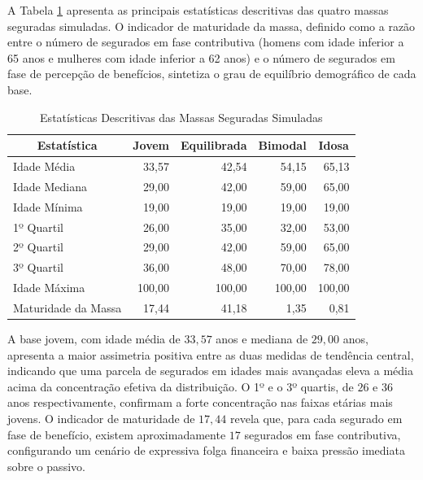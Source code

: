 A Tabela \ref{tab:estatisticas_descritivas} apresenta as principais estatísticas  descritivas das quatro massas seguradas simuladas. O indicador de maturidade da  massa, definido como a razão entre o número de segurados em fase contributiva  (homens com idade inferior a 65 anos e mulheres com idade inferior a 62 anos) e  o número de segurados em fase de percepção de benefícios, sintetiza o grau de  equilíbrio demográfico de cada base.

\vspace{0.25cm}
\begin{table}[htbp]
    \centering
    \caption{Estatísticas Descritivas das Massas Seguradas Simuladas}
    \renewcommand{\arraystretch}{1.2}
    \begin{tabular}{lrrrr}
    \toprule
    \multicolumn{1}{c}{\textbf{Estatística}} & \multicolumn{1}{c}{\textbf{Jovem}} & \multicolumn{1}{c}{\textbf{Equilibrada}} & \multicolumn{1}{c}{\textbf{Bimodal}} & \multicolumn{1}{c}{\textbf{Idosa}} \\
    \midrule
    Idade Média              & 33,57  & 42,54  & 54,15  & 65,13  \\
    Idade Mediana            & 29,00  & 42,00  & 59,00  & 65,00  \\
    Idade Mínima             & 19,00  & 19,00  & 19,00  & 19,00  \\
    1º Quartil               & 26,00  & 35,00  & 32,00  & 53,00  \\
    2º Quartil               & 29,00  & 42,00  & 59,00  & 65,00  \\
    3º Quartil               & 36,00  & 48,00  & 70,00  & 78,00  \\
    Idade Máxima             & 100,00 & 100,00 & 100,00 & 100,00 \\
    Maturidade da Massa      & 17,44  & 41,18  &  1,35  &  0,81  \\
    \bottomrule
    \end{tabular}
    \label{tab:estatisticas_descritivas}
    \vspace{0.25cm}
\end{table}

A base jovem, com idade média de $33{,}57$ anos e mediana de $29{,}00$ anos, apresenta a maior assimetria positiva entre as duas medidas de tendência central, indicando que uma parcela de segurados em idades mais avançadas eleva a média acima da concentração efetiva da distribuição. O 1º e o 3º quartis, de $26$ e $36$ anos respectivamente, confirmam a forte concentração nas faixas etárias mais jovens. O indicador de maturidade de $17{,}44$ revela que, para cada segurado em fase de benefício, existem aproximadamente $17$ segurados em fase contributiva, configurando um cenário de expressiva folga financeira e baixa pressão imediata sobre o passivo.

